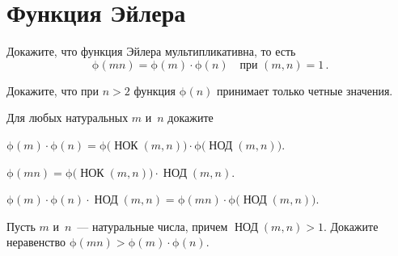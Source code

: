 
\section*{Функция Эйлера}


\begingroup
    \ifx\mathup\undefined
        \def\eulerphi{\upphi}%
    \else
        \def\eulerphi{\mathup{\phi}}%
    \fi
    \providecommand\divides{\mathrel{\vert}}
    \def\GCD{\operatorname{\text{НОД}}}
    \def\LCM{\operatorname{\text{НОК}}}

\begin{problems}

Докажите, что функция Эйлера мультипликативна, то есть
\[
    \eulerphi(m n) = \eulerphi(m) \cdot \eulerphi(n)
\quad
    \text{при $(m, n) = 1$}
\, . \]

\item
Докажите, что при $n > 2$ функция $\eulerphi(n)$ принимает только четные значения.

\end{problems}

\medskip

Для любых натуральных $m$ и~$n$ докажите

\begin{problems}

\item
\(
    \eulerphi(m) \cdot \eulerphi(n)
=
    \eulerphi \bigl( \LCM(m, n) \bigr)
    \cdot
    \eulerphi \bigl( \GCD(m,n) \bigr)
\).

\item
\(
    \eulerphi(m n)
=
    \eulerphi \bigl( \LCM(m, n) \bigr)
    \cdot
    \GCD(m,n)
\).

\item
\(
    \eulerphi(m) \cdot \eulerphi(n) \cdot
    \GCD(m,n)
=
    \eulerphi(m n)
    \cdot
    \eulerphi \bigl( \GCD(m,n) \bigr)
\).

\end{problems}

\medskip

\begin{problems}

\item
Пусть $m$ и~$n$~--- натуральные числа, причем $\GCD(m, n) > 1$.
Докажите неравенство $\eulerphi(m n) > \eulerphi(m) \cdot \eulerphi(n)$.

\end{problems}

